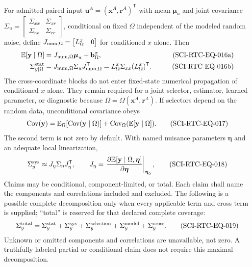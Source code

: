 For admitted paired input $\mathbf u^A=(\mathbf x^A,\mathbf r^A)^{\mathsf T}$
with mean $\boldsymbol\mu_u$ and joint covariance
$\Sigma_u=\left[\begin{smallmatrix}\Sigma_{xx}&\Sigma_{xr}\\
\Sigma_{rx}&\Sigma_{rr}\end{smallmatrix}\right]$, conditional on fixed
$\Omega$ independent of the modeled random noise, define
$J_{\rm num,\Omega}=\begin{bmatrix}L^x_\Omega&0\end{bmatrix}$ for conditioned
$x$ alone.  Then
\begin{align}
 \mathbb E[\mathbf y\mid\Omega]
   &=J_{\rm num,\Omega}\boldsymbol\mu_u+\mathbf b^x_\Omega,
 &\tag{SCI-RTC-EQ-016a}\label{eq:conditional-mean}\\
 \Sigma^{\rm stat}_{y\mid\Omega}
   &=J_{\rm num,\Omega}\Sigma_uJ_{\rm num,\Omega}^{\mathsf T}
     =L^x_\Omega\Sigma_{xx}(L^x_\Omega)^{\mathsf T}.
 &\tag{SCI-RTC-EQ-016b}\label{eq:conditional-cov}
\end{align}
The cross-coordinate blocks do not enter fixed-state numerical propagation
of conditioned $x$ alone.
They remain required for a joint selector, estimator, learned parameter, or
diagnostic because $\Omega=\Omega(\mathbf x^A,\mathbf r^A)$.  If selectors
depend on the random data, unconditional covariance obeys
\begin{equation}
 \operatorname{Cov}(\mathbf y)=
 \mathbb E_\Omega[\operatorname{Cov}(\mathbf y\mid\Omega)]
 +\operatorname{Cov}_\Omega(\mathbb E[\mathbf y\mid\Omega]).
 \tag{SCI-RTC-EQ-017}\label{eq:total-covariance}
\end{equation}
The second term is not zero by default.  With named nuisance parameters
$\boldsymbol\eta$ and an adequate local linearization,
\begin{equation}
 \Sigma_y^{\rm sys}\approx
 J_\eta\Sigma_\eta J_\eta^{\mathsf T},
 \qquad
 J_\eta=\left.
 \frac{\partial\mathbb E[\mathbf y\mid\Omega,\boldsymbol\eta]}
      {\partial\boldsymbol\eta}\right|_{\boldsymbol\eta_0},
 \tag{SCI-RTC-EQ-018}\label{eq:systematic-cov}
\end{equation}
Claims may be conditional, component-limited, or total.  Each claim shall
name the components and correlations included and excluded.  The following is
a possible complete decomposition only when every applicable term and cross
term is supplied; ``total'' is reserved for that declared complete coverage:
\begin{equation}
 \Sigma_y^{\rm total}=
 \Sigma_y^{\rm stat}+\Sigma_y^{\rm sys}
 +\Sigma_y^{\rm selection}+\Sigma_y^{\rm model}
 +\Sigma_y^{\rm cross}.
 \tag{SCI-RTC-EQ-019}\label{eq:total-uncertainty}
\end{equation}
Unknown or omitted components and correlations are unavailable, not zero.  A
truthfully labeled partial or conditional claim does not require this maximal
decomposition.

